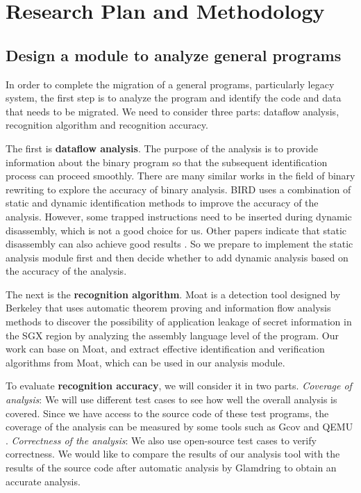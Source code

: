 \section{Research Plan and Methodology}
\subsection{Design a module to analyze general programs}
\label{sec:ToolToAnalyze}
In order to complete the migration of a general programs, particularly legacy system,
the first step is to analyze the program and identify the code and data that needs to
be migrated. We need to consider three parts: dataflow analysis, recognition algorithm
and recognition accuracy.

The first is \textbf{dataflow analysis}. The purpose of the analysis is to provide
information about the binary program so that the subsequent identification process
can proceed smoothly.
There are many similar works in the field of binary rewriting to explore
the accuracy of binary analysis.
BIRD \cite{Nanda2006BIRDBI} uses a combination of static and dynamic identification
methods to improve the accuracy of the analysis. However, some trapped instructions
need to be inserted during dynamic disassembly, which is not a good choice for us.
Other papers indicate that static disassembly can also achieve good results
\cite{Andriesse2016AnIA}. So we prepare to implement the static analysis module first
and then decide whether to add dynamic analysis based on the accuracy of the analysis.

The next is the \textbf{recognition algorithm}.
Moat \cite{Sinha2015MoatVC} is a detection tool designed by Berkeley that uses
automatic theorem proving and information flow analysis methods to discover the
possibility of application leakage of secret information in the SGX region by
analyzing the assembly language level of the program.
Our work can base on Moat, and extract effective identification and verification
algorithms from Moat, which can be used in our analysis module.

To evaluate \textbf{recognition accuracy}, we will consider it in two parts.
\textit{Coverage of analysis}:
We will use different test cases to see how well the overall analysis is covered.
Since we have access to the source code of these test programs,
the coverage of the analysis can be measured by some tools such as Gcov \cite{GCOV}
and QEMU \cite{Bellard2005QEMUAF}.
\textit{Correctness of the analysis}:
We also use open-source test cases to verify correctness.
We would like to compare the results of our analysis tool with the results of the
source code after automatic analysis by Glamdring \cite{Lind2017GlamdringAA} to obtain
an accurate analysis.

